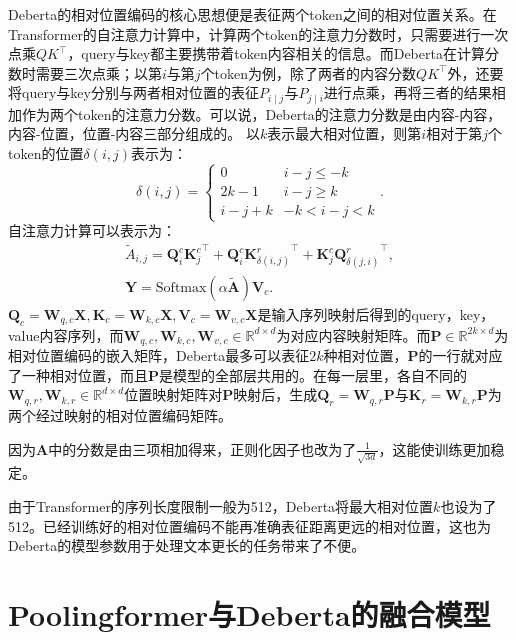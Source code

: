 Deberta\cite{he2020deberta}的相对位置编码的核心思想便是表征两个token之间的相对位置关系。在Transformer的自注意力计算中，计算两个token的注意力分数时，只需要进行一次点乘$QK^\top$，query与key都主要携带着token内容相关的信息。而Deberta在计算分数时需要三次点乘；以第$i$与第$j$个token为例，除了两者的内容分数$QK^\top$外，还要将query与key分别与两者相对位置的表征$P_{i\mid j}$与$P_{j\mid i}$进行点乘，再将三者的结果相加作为两个token的注意力分数。可以说，Deberta的注意力分数是由内容-内容，内容-位置，位置-内容三部分组成的。
以$k$表示最大相对位置，则第$i$相对于第$j$个token的位置$\delta(i,j)$表示为：
\begin{equation}
\delta(i,j)=
\begin{cases}
0 & i-j\le -k \\
2k-1 & i-j\ge k \\
i-j+k & -k<i-j<k
\end{cases}.
\label{eq:rel_pos}
\end{equation}
自注意力计算可以表示为：
\begin{align}
\widetilde{A}_{i,j}=\mathbf{Q}^c_i {\mathbf{K}^c_j}^\top + \mathbf{Q}^c_i {\mathbf{K}^r_{\delta(i,j)}}^\top +  \mathbf{K}^c_j {\mathbf{Q}^r_{\delta(j,i)}}^\top,\\
\mathbf{Y}=\text{Softmax}(\alpha\mathbf{\widetilde{A}})\mathbf{V}_c.
\label{eq:deberta_att}
\end{align}
$\mathbf{Q}_c = \mathbf{W}_{q,c}\mathbf{X},\mathbf{K}_c = \mathbf{W}_{k,c}\mathbf{X},\mathbf{V}_c = \mathbf{W}_{v,c}\mathbf{X}$是输入序列映射后得到的query，key，value内容序列，而$\mathbf{W}_{q,c},\mathbf{W}_{k,c},\mathbf{W}_{v,c} \in \mathbb{R}^{d \times d}$为对应内容映射矩阵。而$\mathbf{P} \in \mathbb{R}^{2k \times d}$为相对位置编码的嵌入矩阵，Deberta最多可以表征$2k$种相对位置，$\mathbf{P}$的一行就对应了一种相对位置，而且$\mathbf{P}$是模型的全部层共用的。在每一层里，各自不同的$\mathbf{W}_{q,r},\mathbf{W}_{k,r} \in \mathbb{R}^{d \times d}$位置映射矩阵对$\mathbf{P}$映射后，生成$\mathbf{Q}_r = \mathbf{W}_{q,r}\mathbf{P}$与$\mathbf{K}_r = \mathbf{W}_{k,r}\mathbf{P}$为两个经过映射的相对位置编码矩阵。

因为$\mathbf{A}$中的分数是由三项相加得来，正则化因子也改为了$\frac{1}{\sqrt{3d}}$，这能使训练更加稳定。

由于Transformer的序列长度限制一般为512，Deberta将最大相对位置$k$也设为了512。已经训练好的相对位置编码不能再准确表征距离更远的相对位置，这也为Deberta的模型参数用于处理文本更长的任务带来了不便。

\section{Poolingformer与Deberta的融合模型}
\label{sec:pd}

